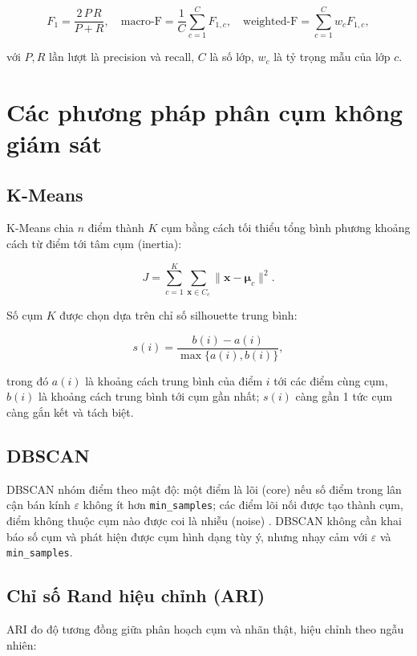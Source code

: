 \begin{equation}
F_1 = \frac{2\,P\,R}{P+R}, \quad
\text{macro-F} = \frac{1}{C}\sum_{c=1}^{C} F_{1,c}, \quad
\text{weighted-F} = \sum_{c=1}^{C} w_c F_{1,c},
\label{eq:f1}
\end{equation}

với $P,R$ lần lượt là precision và recall, $C$ là số lớp, $w_c$ là tỷ trọng mẫu của lớp $c$.

\section{Các phương pháp phân cụm không giám sát}

\subsection{K-Means}
K-Means chia $n$ điểm thành $K$ cụm bằng cách tối thiểu tổng bình phương khoảng cách từ
điểm tới tâm cụm (inertia):

\begin{equation}
J = \sum_{c=1}^{K} \sum_{\mathbf{x} \in C_c} \|\mathbf{x} - \boldsymbol{\mu}_c\|^2.
\label{eq:kmeans}
\end{equation}

Số cụm $K$ được chọn dựa trên chỉ số silhouette trung bình:

\begin{equation}
s(i) = \frac{b(i) - a(i)}{\max\{a(i), b(i)\}},
\label{eq:silhouette}
\end{equation}

trong đó $a(i)$ là khoảng cách trung bình của điểm $i$ tới các điểm cùng cụm, $b(i)$ là
khoảng cách trung bình tới cụm gần nhất; $s(i)$ càng gần 1 tức cụm càng gắn kết và tách biệt.

\subsection{DBSCAN}
DBSCAN nhóm điểm theo mật độ: một điểm là lõi (core) nếu số điểm trong lân cận bán kính
$\varepsilon$ không ít hơn \texttt{min\_samples}; các điểm lõi nối được tạo thành cụm, điểm
không thuộc cụm nào được coi là nhiễu (noise) \cite{ester1996}. DBSCAN không cần khai báo số
cụm và phát hiện được cụm hình dạng tùy ý, nhưng nhạy cảm với $\varepsilon$ và
\texttt{min\_samples}.

\subsection{Chỉ số Rand hiệu chỉnh (ARI)}
ARI đo độ tương đồng giữa phân hoạch cụm và nhãn thật, hiệu chỉnh theo ngẫu nhiên:

